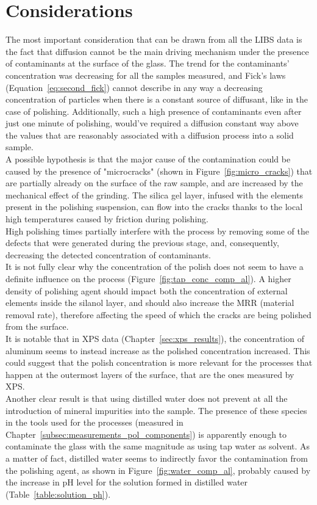 \section{Considerations}
\label{sec:considerations}
The most important consideration that can be drawn from all the LIBS data is the fact that diffusion cannot be the main driving mechanism under the presence of contaminants at the surface of the glass. The trend for the contaminants' concentration was decreasing for all the samples measured, and Fick's laws (Equation~\ref{eq:second_fick}) cannot describe in any way a decreasing concentration of particles when there is a constant source of diffusant, like in the case of polishing. Additionally, such a high presence of contaminants even after just one minute of polishing, would've required a diffusion constant way above the values that are reasonably associated with a diffusion process into a solid sample.
\\
A possible hypothesis is that the major cause of the contamination could be caused by the presence of "microcracks" (shown in Figure~\ref{fig:micro_cracks}) that are partially already on the surface of the raw sample, and are increased by the mechanical effect of the grinding. The silica gel layer, infused with the elements present in the polishing suspension, can flow into the cracks thanks to the local high temperatures caused by friction during polishing.
\\
High polishing times partially interfere with the process by removing some of the defects that were generated during the previous stage, and, consequently, decreasing the detected concentration of contaminants.
\\
It is not fully clear why the concentration of the polish does not seem to have a definite influence on the process (Figure~\ref{fig:tap_conc_comp_al}). A higher density of polishing agent should impact both the concentration of external elements inside the silanol layer, and should also increase the MRR (material removal rate), therefore affecting the speed of which the cracks are being polished from the surface.
\\
It is notable that in XPS data (Chapter~\ref{sec:xps_results}), the concentration of aluminum seems to instead increase as the polished concentration increased. This could suggest that the polish concentration is more relevant for the processes that happen at the outermost layers of the surface, that are the ones measured by XPS.
\\
Another clear result is that using distilled water does not prevent at all the introduction of mineral impurities into the sample. The presence of these species in the tools used for the processes (measured in Chapter~\ref{subsec:measurements_pol_components}) is apparently enough to contaminate the glass with the same magnitude as using tap water as solvent. As a matter of fact, distilled water seems to indirectly favor the contamination from the polishing agent, as shown in Figure~\ref{fig:water_comp_al}, probably caused by the increase in pH level for the solution formed in distilled water (Table~\ref{table:solution_ph}).

